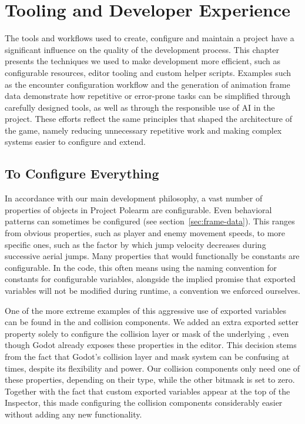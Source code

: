 \documentclass[../Main.tex]{subfiles}
\begin{document}
\section{Tooling and Developer Experience}\label{sec:tooling-and-developer-experience}

The tools and workflows used to create, configure and maintain a project have a significant influence on the quality of the development process. This chapter presents the techniques we used to make development more efficient, such as configurable resources, editor tooling and custom helper scripts. Examples such as the encounter configuration workflow and the generation of animation frame data demonstrate how repetitive or error-prone tasks can be simplified through carefully designed tools, as well as through the responsible use of AI in the project. These efforts reflect the same principles that shaped the architecture of the game, namely reducing unnecessary repetitive work and making complex systems easier to configure and extend.

\subsection{To Configure Everything}\label{sec:to-configure-everything}

In accordance with our main development philosophy, a vast number of properties of objects in Project Polearm are configurable. Even behavioral patterns can sometimes be configured (see section~\ref{sec:frame-data}). This ranges from obvious properties, such as player and enemy movement speeds, to more specific ones, such as the factor by which jump velocity decreases during successive aerial jumps. Many properties that would functionally be constants are configurable. In the code, this often means using the naming convention for constants for configurable variables, alongside the implied promise that exported variables will not be modified during runtime, a convention we enforced ourselves.

One of the more extreme examples of this aggressive use of exported variables can be found in the  and  collision components. We added an extra exported setter property solely to configure the collision layer or mask of the underlying , even though Godot already exposes these properties in the editor. This decision stems from the fact that Godot's collision layer and mask system can be confusing at times, despite its flexibility and power. Our collision components only need one of these properties, depending on their type, while the other bitmask is set to zero. Together with the fact that custom exported variables appear at the top of the Inspector, this made configuring the collision components considerably easier without adding any new functionality.
\end{document}
